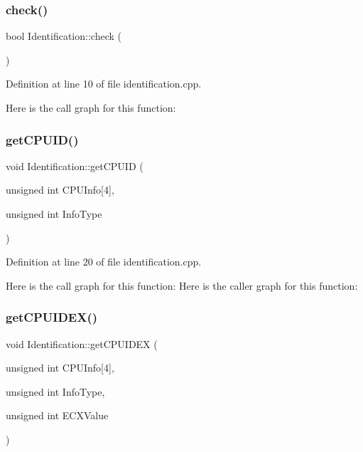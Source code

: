 \subsubsection{\texorpdfstring{check()}{check()}}
{\footnotesize\ttfamily bool Identification\+::check (\begin{DoxyParamCaption}{ }\end{DoxyParamCaption})\hspace{0.3cm}{\ttfamily [static]}}



Definition at line 10 of file identification.\+cpp.

Here is the call graph for this function\+:
\mbox{\label{class_identification_a2c6a597de6b24679e755aafba5657fef}} 
\subsubsection{\texorpdfstring{get\+C\+P\+U\+I\+D()}{getCPUID()}}
{\footnotesize\ttfamily void Identification\+::get\+C\+P\+U\+ID (\begin{DoxyParamCaption}\item[{unsigned int}]{C\+P\+U\+Info\mbox{[}4\mbox{]},  }\item[{unsigned int}]{Info\+Type }\end{DoxyParamCaption})\hspace{0.3cm}{\ttfamily [static]}}



Definition at line 20 of file identification.\+cpp.

Here is the call graph for this function\+:
Here is the caller graph for this function\+:
\mbox{\label{class_identification_ad6429aef1faa0a8bb9bd423998bb8889}} 
\subsubsection{\texorpdfstring{get\+C\+P\+U\+I\+D\+E\+X()}{getCPUIDEX()}}
{\footnotesize\ttfamily void Identification\+::get\+C\+P\+U\+I\+D\+EX (\begin{DoxyParamCaption}\item[{unsigned int}]{C\+P\+U\+Info\mbox{[}4\mbox{]},  }\item[{unsigned int}]{Info\+Type,  }\item[{unsigned int}]{E\+C\+X\+Value }\end{DoxyParamCaption})\hspace{0.3cm}{\ttfamily [static]}}



